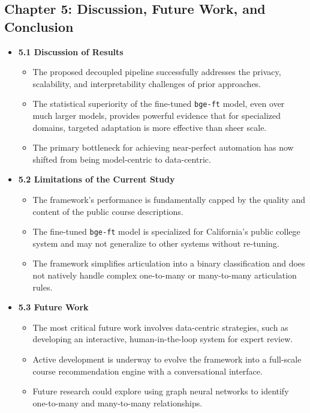 \documentclass[11pt]{article}
\begin{document}
\subsection*{Chapter 5: Discussion, Future Work, and Conclusion}
\begin{itemize}
    \item \textbf{5.1 Discussion of Results}
    \begin{itemize}
        \item The proposed decoupled pipeline successfully addresses the privacy, scalability, and interpretability challenges of prior approaches.
        \item The statistical superiority of the fine-tuned \texttt{bge-ft} model, even over much larger models, provides powerful evidence that for specialized domains, targeted adaptation is more effective than sheer scale.
        \item The primary bottleneck for achieving near-perfect automation has now shifted from being model-centric to data-centric.
    \end{itemize}
    \item \textbf{5.2 Limitations of the Current Study}
    \begin{itemize}
        \item The framework's performance is fundamentally capped by the quality and content of the public course descriptions.
        \item The fine-tuned \texttt{bge-ft} model is specialized for California's public college system and may not generalize to other systems without re-tuning.
        \item The framework simplifies articulation into a binary classification and does not natively handle complex one-to-many or many-to-many articulation rules.
    \end{itemize}
    \item \textbf{5.3 Future Work}
    \begin{itemize}
        \item The most critical future work involves data-centric strategies, such as developing an interactive, human-in-the-loop system for expert review.
        \item Active development is underway to evolve the framework into a full-scale course recommendation engine with a conversational interface.
        \item Future research could explore using graph neural networks to identify one-to-many and many-to-many relationships.
    \end{itemize}

\end{itemize}
\end{document}

